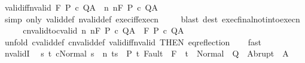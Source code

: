 \begin{isabellebody}
\isamarkupfalse%
\ valid{\isacharunderscore}iff{\isacharunderscore}nvalid{\isacharcolon}\ {\isachardoublequoteopen}{\isasymGamma}{\isasymTurnstile}\isactrlbsub {\isacharslash}F\isactrlesub \ P\ c\ Q{\isacharcomma}A\ {\isacharequal}\ {\isacharparenleft}{\isasymforall}n{\isachardot}\ {\isasymGamma}{\isasymTurnstile}n{\isacharcolon}\isactrlbsub {\isacharslash}F\isactrlesub \ P\ c\ Q{\isacharcomma}A{\isacharparenright}{\isachardoublequoteclose}\isanewline
%
\isadelimproof
\ \ %
\endisadelimproof
%
\isatagproof
{}\isamarkupfalse%
\ {\isacharparenleft}simp\ only{\isacharcolon}\ valid{\isacharunderscore}def\ nvalid{\isacharunderscore}def\ exec{\isacharunderscore}iff{\isacharunderscore}execn\ {\isacharparenright}\isanewline
\ \ \isamarkupfalse%
\ {\isacharparenleft}blast\ dest{\isacharcolon}\ exec{\isacharunderscore}final{\isacharunderscore}notin{\isacharunderscore}to{\isacharunderscore}execn{\isacharparenright}\isanewline
\ \ \isamarkupfalse%
%
\endisatagproof
{\isafoldproof}%
%
\isadelimproof
\isanewline
%
\endisadelimproof
\ \isanewline
{}\isamarkupfalse%
\ cnvalid{\isacharunderscore}to{\isacharunderscore}cvalid{\isacharcolon}\ {\isachardoublequoteopen}{\isacharparenleft}{\isasymforall}n{\isachardot}\ {\isasymGamma}{\isacharcomma}{\isasymTheta}{\isasymTurnstile}n{\isacharcolon}\isactrlbsub {\isacharslash}F\isactrlesub \ P\ c\ Q{\isacharcomma}A{\isacharparenright}\ {\isasymLongrightarrow}\ {\isasymGamma}{\isacharcomma}{\isasymTheta}{\isasymTurnstile}\isactrlbsub {\isacharslash}F\isactrlesub \ P\ c\ Q{\isacharcomma}A{\isachardoublequoteclose}\isanewline
%
\isadelimproof
\ \ %
\endisadelimproof
%
\isatagproof
{}\isamarkupfalse%
\ {\isacharparenleft}unfold\ cvalid{\isacharunderscore}def\ cnvalid{\isacharunderscore}def\ valid{\isacharunderscore}iff{\isacharunderscore}nvalid\ {\isacharbrackleft}THEN\ eq{\isacharunderscore}reflection{\isacharbrackright}{\isacharparenright}\isanewline
\ \ \isamarkupfalse%
\ fast\isanewline
\ \ \isamarkupfalse%
%
\endisatagproof
{\isafoldproof}%
%
\isadelimproof
\isanewline
%
\endisadelimproof
\isanewline
{}\isamarkupfalse%
\ nvalidI{\isacharcolon}\ \isanewline
\ {\isachardoublequoteopen}{\isasymlbrakk}{\isasymAnd}s\ t{\isachardot}\ {\isasymlbrakk}{\isasymGamma}{\isasymturnstile}{\isasymlangle}c{\isacharcomma}Normal\ s\ {\isasymrangle}\ {\isacharequal}n{\isasymRightarrow}\ t{\isacharsemicolon}s\ {\isasymin}\ P{\isacharsemicolon}\ t{\isasymnotin}\ Fault\ {\isacharbackquote}\ F{\isasymrbrakk}\ {\isasymLongrightarrow}\ t\ {\isasymin}\ Normal\ {\isacharbackquote}\ Q\ {\isasymunion}\ Abrupt\ {\isacharbackquote}\ A{\isasymrbrakk}\isanewline

\end{isabellebody}
